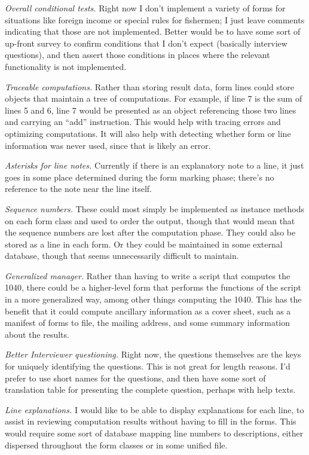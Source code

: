 \documentclass[12pt]{article}
\begin{document}
\emph{Overall conditional tests.} Right now I don't implement a variety of forms
for situations like foreign income or special rules for fishermen; I just leave
comments indicating that those are not implemented. Better would be to have some
sort of up-front survey to confirm conditions that I don't expect (basically
interview questions), and then assert those conditions in places where the
relevant functionality is not implemented.

\emph{Traceable computations.} Rather than storing result data, form lines could
store objects that maintain a tree of computations. For example, if line 7 is
the sum of lines 5 and 6, line 7 would be presented as an object referencing
those two lines and carrying an ``add'' instruction. This would help with
tracing errors and optimizing computations. It will also help with detecting
whether form or line information was never used, since that is likely an error.

\emph{Asterisks for line notes.} Currently if there is an explanatory note to a
line, it just goes in some place determined during the form marking phase;
there's no reference to the note near the line itself.

\emph{Sequence numbers.} These could most simply be implemented as instance
methods on each form class and used to order the output, though that would mean
that the sequence numbers are lost after the computation phase. They could also
be stored as a line in each form. Or they could be maintained in some external
database, though that seems unnecessarily difficult to maintain.

\emph{Generalized manager.} Rather than having to write a script that computes
the 1040, there could be a higher-level form that performs the functions of the
script in a more generalized way, among other things computing the 1040. This
has the benefit that it could compute ancillary information as a cover sheet,
such as a manifest of forms to file, the mailing address, and some summary
information about the results.

\emph{Better Interviewer questioning.} Right now, the questions themselves are
the keys for uniquely identifying the questions. This is not great for length
reasons. I'd prefer to use short names for the questions, and then have some
sort of translation table for presenting the complete question, perhaps with
help texts.

\emph{Line explanations.} I would like to be able to display explanations for
each line, to assist in reviewing computation results without having to fill in
the forms. This would require some sort of database mapping line numbers to
descriptions, either dispersed throughout the form classes or in some unified
file.
\end{document}
